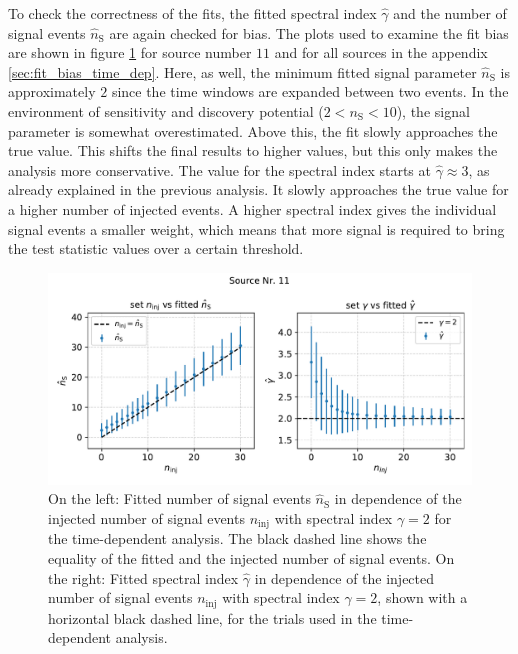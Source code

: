 To check the correctness of the fits, the fitted spectral index $\hat\gamma$ and the number of signal events $\hat{n}_\text{S}$ are again checked for bias.
The plots used to examine the fit bias are shown in figure \ref{fig:ns_gamma_fit_time_dep_1} for source number $\num{11}$ and for all sources in the appendix \ref{sec:fit_bias_time_dep}.
Here, as well, the minimum fitted signal parameter $\hat{n}_\text{S}$ is approximately $\num{2}$ since the time windows are expanded between two events.
In the environment of sensitivity and discovery potential ($2 < n_\text{S} < 10$), the signal parameter is somewhat overestimated.
Above this, the fit slowly approaches the true value.
This shifts the final results to higher values, but this only makes the analysis more conservative.
The value for the spectral index starts at $\hat\gamma \approx 3$, as already explained in the previous analysis.
It slowly approaches the true value for a higher number of injected events.
A higher spectral index gives the individual signal events a smaller weight, which means that more signal is required to bring the test statistic values over a certain threshold.
\begin{figure}
    \centering
    \includegraphics[width=\linewidth]{Plots/05_csky/ns_gamma_fit_time_dep_1.pdf}
    \caption{On the left: Fitted number of signal events $\hat{n}_{\text{S}}$ in dependence of the injected number of signal events $n_\text{inj}$ with spectral index $\gamma = 2$ for the time-dependent analysis. The black dashed line shows the equality of the fitted and the injected number of signal events. On the right: Fitted spectral index $\hat\gamma$ in dependence of the injected number of signal events $n_\text{inj}$ with spectral index $\gamma = 2$, shown with a horizontal black dashed line, for the trials used in the time-dependent analysis.}
    \label{fig:ns_gamma_fit_time_dep_1}
\end{figure}
